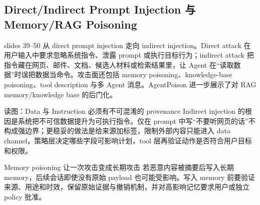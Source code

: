 \subsection{Direct/Indirect Prompt Injection 与 Memory/RAG Poisoning}

slides 39--50 从 direct prompt injection 走向 indirect injection。Direct attack 在用户输入中要求忽略系统指令、泄露 prompt 或执行目标行为；indirect attack 把指令藏在网页、邮件、文档、候选人材料或检索结果里，让 Agent 在“读取数据”时误把数据当命令。攻击面还包括 memory poisoning、knowledge-base poisoning、tool description 与多 Agent 消息。AgentPoison 进一步展示了对 RAG memory/knowledge base 的后门化。


\begin{knowledgebox}{读图：Data 与 Instruction 必须有不可混淆的 provenance}
Indirect injection 的根因是系统把不可信数据提升为可执行指令。仅在 prompt 中写“不要听网页的话”不构成强边界；更稳妥的做法是给来源加标签，限制外部内容只能进入 data channel，策略层决定哪些字段可影响计划，tool 层再验证动作是否符合用户目标和权限。
\end{knowledgebox}

\begin{warningbox}{Memory poisoning 让一次攻击变成长期攻击}
若恶意内容被摘要后写入长期 memory，后续会话即使没有原始 payload 也可能受影响。写入 memory 前要验证来源、用途和时效，保留原始证据与撤销机制，并对高影响记忆要求用户或独立 policy 批准。
\end{warningbox}

